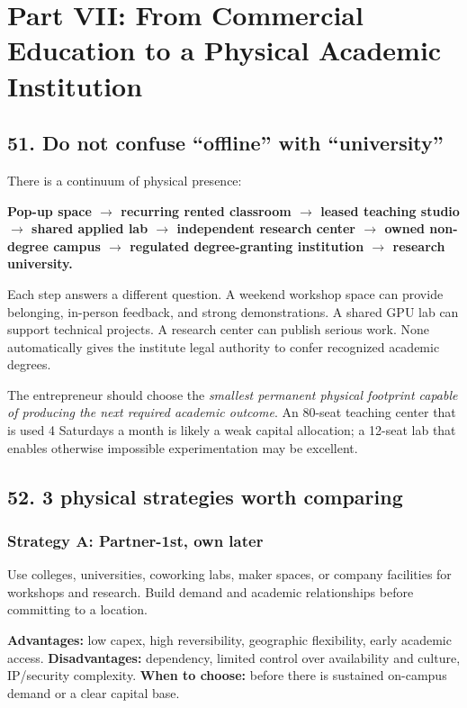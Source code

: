 
\section*{Part VII: From Commercial Education to a Physical Academic Institution}

\subsection{51. Do not confuse ``offline'' with ``university''}

There is a continuum of physical presence:

\textbf{Pop-up space $\rightarrow$ recurring rented classroom $\rightarrow$ leased teaching studio $\rightarrow$ shared applied lab $\rightarrow$ independent research center $\rightarrow$ owned non-degree campus $\rightarrow$ regulated degree-granting institution $\rightarrow$ research university.}

Each step answers a different question. A weekend workshop space can provide belonging, in-person feedback, and strong demonstrations. A shared GPU lab can support technical projects. A research center can publish serious work. None automatically gives the institute legal authority to confer recognized academic degrees.

The entrepreneur should choose the \textit{smallest permanent physical footprint capable of producing the next required academic outcome}. An 80-seat teaching center that is used 4 Saturdays a month is likely a weak capital allocation; a 12-seat lab that enables otherwise impossible experimentation may be excellent.

\subsection{52. 3 physical strategies worth comparing}

\subsubsection*{Strategy A: Partner-1st, own later}

Use colleges, universities, coworking labs, maker spaces, or company facilities for workshops and research. Build demand and academic relationships before committing to a location.

\textbf{Advantages:} low capex, high reversibility, geographic flexibility, early academic access.
\textbf{Disadvantages:} dependency, limited control over availability and culture, IP/\allowbreak security complexity.
\textbf{When to choose:} before there is sustained on-campus demand or a clear capital base.

